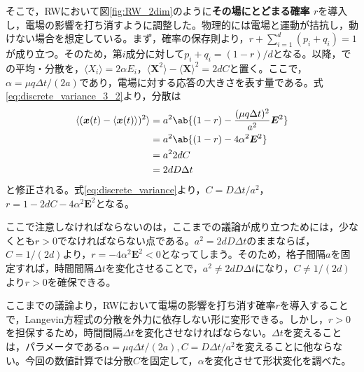 \documentclass[autodetect-engine,dvi=dvipdfmx,a4paper,ja=standard,oneside,openany,11pt]{bxjsbook}
\begin{document}
そこで，RWにおいて図\ref{fig:RW_2dim}のように\textbf{その場にとどまる確率 $r$}を導入し，電場の影響を打ち消すように調整した。物理的には電場と運動が拮抗し，動けない場合を想定している。まず，確率の保存則より，$r+\sum_{i=1}^{d}(p_i+q_i) =1$が成り立つ。そのため，第$i$成分に対して$p_i+q_i=(1-r)/d$となる。以降，での平均・分散を，$\langle X_i\rangle=2\alpha E_i$，$\langle\bm{X}^2\rangle-\langle\bm{X}\rangle^2=2dC$と置く。ここで，$\alpha=\mu q\Delta t/(2a)$であり，電場に対する応答の大きさを表す量である。式\eqref{eq:discrete_variance_3_2}より，分散は
\begin{equation}
  \begin{split}
    \langle(\bm{x}(t)-\langle\bm{x}(t)\rangle)^2\rangle & =a^2\ab\{(1-r)-\frac{(\mu q \Delta t)^2}{a^2}\bm{E}^2\} \\
                                                        & =a^2\ab\{(1-r)-4\alpha^2\bm{E}^2\}                      \\
                                                        & =a^2 2dC                                                \\
                                                        & =2dD\Delta t
  \end{split}
  \label{eq:discrete_variance}
\end{equation}
と修正される。式\eqref{eq:discrete_variance}より，$C=D\Delta t/a^2$，$r=1-2dC-4\alpha^2\bm{E}^2$となる。

ここで注意しなければならないのは，ここまでの議論が成り立つためには，少なくとも$r>0$でなければならない点である。$a^2=2dD\Delta t$のままならば，$C=1/(2d)$より，$r=-4\alpha^2\bm{E}^2<0$となってしまう。そのため，格子間隔$a$を固定すれば，時間間隔$\Delta t$を変化させることで，$a^2\neq2dD\Delta t$になり，$C\neq1/(2d)$より$r>0$を確保できる。

ここまでの議論より，RWにおいて電場の影響を打ち消す確率$r$を導入することで，Langevin方程式の分散を外力に依存しない形に変形できる。しかし，$r>0$を担保するため，時間間隔$\Delta t$を変化させなければならない。$\Delta t$を変えることは，パラメータである$\alpha=\mu q\Delta t/(2a),C=D\Delta t/a^2$を変えることに他ならない。今回の数値計算では分散$C$を固定して，$\alpha$を変化させて形状変化を調べた。
\end{document}
